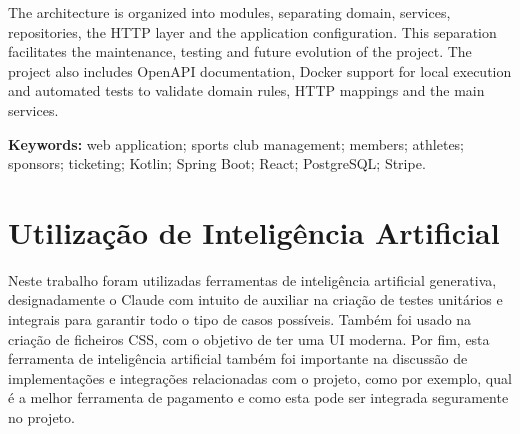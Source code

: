 \documentclass[a4paper,openright,twoside,11pt]{report}
\begin{document}
The architecture is organized into modules, separating domain, services, 
repositories, the HTTP layer and the application configuration. This separation 
facilitates the maintenance, testing and future evolution of the project. The 
project also includes OpenAPI documentation, Docker support for local execution 
and automated tests to validate domain rules, HTTP mappings and the main 
services.

\textbf{Keywords:} web application; sports club management; members; athletes; 
sponsors; ticketing; Kotlin; Spring Boot; React; PostgreSQL; Stripe.
\cleardoublepage
\chapter*{Utilização de Inteligência Artificial}
Neste trabalho foram utilizadas ferramentas de inteligência artificial generativa, designadamente o Claude com intuito de auxiliar na criação de testes unitários e integrais para garantir todo o tipo de casos possíveis.
Também foi usado na criação de ficheiros CSS, com o objetivo de ter uma UI moderna.
Por fim, esta ferramenta de inteligência artificial também foi importante na discussão de implementações e integrações relacionadas com o projeto, como por exemplo, qual é a melhor ferramenta de pagamento e como esta pode ser integrada seguramente no projeto.\\

\cleardoublepage
\tableofcontents \cleardoublepage

\listoffigures \cleardoublepage

\setcounter{page}{1}
















\appendix

\end{document}
